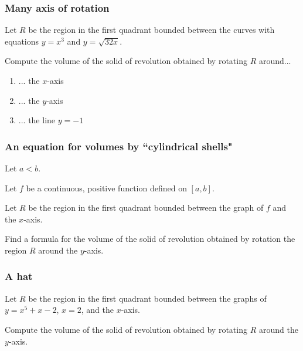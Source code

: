 \documentclass[14pt]{beamer}
\begin{document}
	\begin{frame}[t]
		\frametitle{Many axis of rotation}

		Let $R$ be the region in the first quadrant bounded between the curves with
		equations $\displaystyle y = x^{3}$ and $\displaystyle y=\sqrt{32x}$.

		Compute the volume of the solid of revolution obtained by rotating $R$
		around...
		\begin{enumerate}
			\item ... the $x$-axis

			\item ... the $y$-axis

			\item ... the line $y=-1$
		\end{enumerate}
	\end{frame}

	\begin{frame}[t]
		\frametitle{An equation for volumes by ``cylindrical shells"}

		Let $a < b$.

		Let $f$ be a continuous, positive function defined on $[a,b]$.

		Let $R$ be the region in the first quadrant bounded between the graph of $f$
		and the $x$-axis.

		Find a formula for the volume of the solid of revolution obtained by rotation
		the region $R$ around the $y$-axis.
	\end{frame}

	\begin{frame}[t]
		\frametitle{A hat}

		Let $R$ be the region in the first quadrant bounded between the graphs of
		$\displaystyle y=x^{5}+x-2$, $\displaystyle x=2$, and the $\displaystyle x$-axis.

		Compute the volume of the solid of revolution obtained by rotating $R$
		around the $y$-axis.
	\end{frame}
\end{document}
